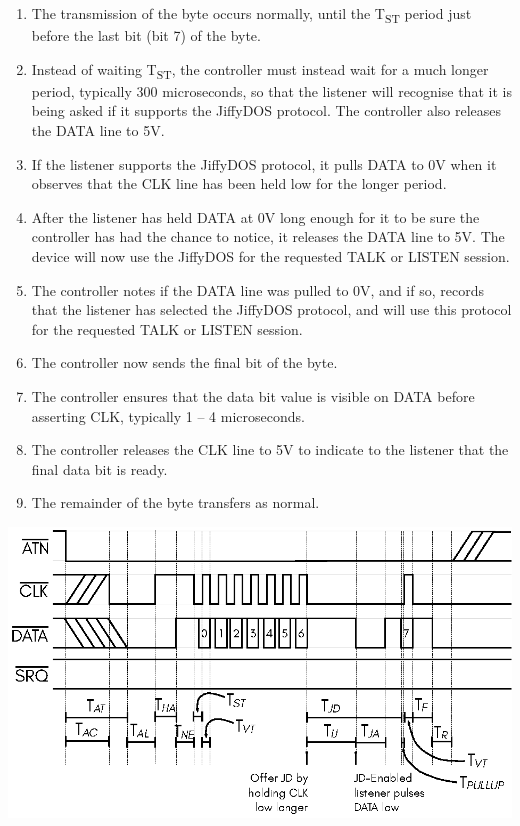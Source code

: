 \begin{enumerate}
  \item The transmission of the byte occurs normally, until the
    T\textsubscript{ST} period just before the last bit (bit 7) of the
    byte.
  \item Instead of waiting T\textsubscript{ST}, the controller must
    instead wait for a much longer period, typically 300
    microseconds, so that the listener will recognise that it is
    being asked if it supports the JiffyDOS{\textrademark}
    protocol. The controller also releases the DATA line to 5V.
  \item If the listener supports the JiffyDOS{\texttrademark} protocol,
    it pulls DATA to 0V when it observes that the CLK line has been
    held low for the longer period.
  \item After the listener has held DATA at 0V long enough for it
    to be sure the controller has had the chance to notice, it
    releases the DATA line to 5V. The device will now use the
    JiffyDOS{\texttrademark} for the requested TALK or LISTEN session.
  \item The controller notes if the DATA line was pulled to 0V, and if
    so, records that the listener has selected the
    JiffyDOS{\texttrademark} protocol, and will use this protocol for the
    requested TALK or LISTEN session.
  \item The controller now sends the final bit of the byte.
  \item The controller ensures that the data bit value is visible on
    DATA before asserting CLK, typically 1 -- 4 microseconds.
  \item The controller releases the CLK line to 5V to indicate to
    the listener that the final data bit is ready.
  \item The remainder of the byte transfers as normal.
\end{enumerate}

\begin{center}
\includegraphics{images/IEC-Timing-Diagrams/IEC-Timing-Diagram-ATN-JD-Solicit}
\end{center}

